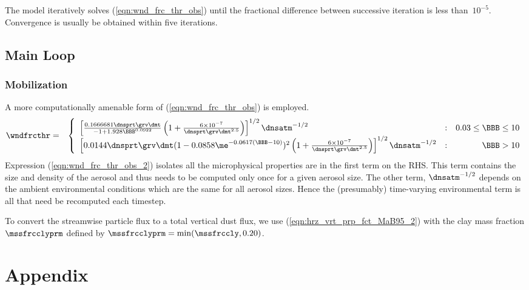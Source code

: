 \documentclass[12pt,twoside]{book}
\begin{document}
The model iteratively solves (\ref{eqn:wnd_frc_thr_obs}) until the
fractional difference between successive iteration is less
than~$10^{-5}$.  
Convergence is usually be obtained within five iterations.

\section{Main Loop}\label{sxn:loop}

\subsection{Mobilization}\label{sxn:mdl_mbl}
A more computationally amenable form of (\ref{eqn:wnd_frc_thr_obs}) is
employed.
\begin{eqnarray}
\wndfrcthr & = & \left\{
\begin{array}{l@{\quad:\quad}r}
\left[
\frac{0.1666681 \dnsprt \grv \dmt}{-1 + 1.928 \BBB^{0.0922}}
\left( 1 + \frac{6 \times 10^{-7}}{\dnsprt \grv \dmt^{2.5}} \right)
\right]^{1/2}
\dnsatm^{-1/2}
& 0.03 \le \BBB \le 10 \\
\left[
0.0144 \dnsprt \grv \dmt ( 1 - 0.0858 \me^{ -0.0617 ( \BBB - 10 ) } )^{2}
\left( 1 + \frac{6 \times 10^{-7}}{\dnsprt \grv \dmt^{2.5} } \right)
\right]^{1/2}
\dnsatm^{-1/2}
& \BBB > 10
\end{array} \right.
\label{eqn:wnd_frc_thr_obs_2}
\end{eqnarray}
Expression (\ref{eqn:wnd_frc_thr_obs_2}) isolates all the
microphysical properties are in the first term on the RHS.
This term contains the size and density of the aerosol and thus needs
to be computed only once for a given aerosol size. 
The other term, $\dnsatm^{-1/2}$ depends on the ambient environmental
conditions which are the same for all aerosol sizes.
Hence the (presumably) time-varying environmental term is all that
need be recomputed each timestep.

To convert the streamwise particle flux to a total vertical dust flux,
we use (\ref{eqn:hrz_vrt_prp_fct_MaB95_2}) with the clay mass fraction
$\mssfrcclyprm$ defined by $\mssfrcclyprm = \min(\mssfrccly,0.20)$.

\chapter{Appendix}\label{sxn:app}
\end{document}
